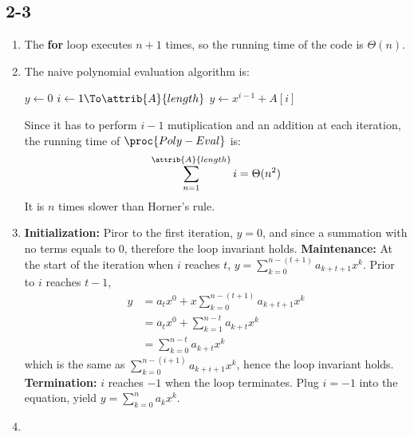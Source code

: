 \subsection{2-3}
\begin{enumerate}[leftmargin=*]
	\item The \textbf{for} loop executes $n+1$ times,
		so the running time of the code is $\Theta(n)$.
	\item The naive polynomial evaluation algorithm is:\\
		\vspace{-1.5em}
		\begin{codebox}
		\li	$y\gets 0$
		\li	\For $i\gets 1 \To \attrib{A}{length}$
			\Do
		\li		$y\gets x^{i-1}+A[i]$
			\End
		\end{codebox}
		Since it has to perform $i-1$ mutiplication and
		an addition at each iteration, the running time of
		$\proc{Poly-Eval}$ is:
		\begin{displaymath}
			\sum_{n=1}^{\attrib{A}{length}} i=\Theta(n^2)
		\end{displaymath}
		It is $n$ times slower than Horner's rule.
	\item \textbf{Initialization:} Piror to the first
		iteration, $y=0$, and since a summation with
		no terms equals to $0$, therefore the loop
		invariant holds.
		\textbf{Maintenance:} At the start of
		the iteration when $i$ reaches $t$,
		$y=\sum_{k=0}^{n-(t+1)}a_{k+t+1}x^k$.
		Prior to $i$ reaches $t-1$,
		\begin{align*}
			y&= a_tx^0+x\sum_{k=0}^{n-(t+1)}a_{k+t+1}x^k\\
			 &= a_tx^0+\sum_{k=1}^{n-t}a_{k+t}x^k\\
			 &= \sum_{k=0}^{n-t}a_{k+t}x^k
		\end{align*}
		which is the same as
		$\sum_{k=0}^{n-(i+1)}a_{k+i+1}x^k$,
		hence the loop invariant holds.\\
		\textbf{Termination:} $i$ reaches $-1$ when the loop terminates.
		Plug $i=-1$ into the equation, yield
		$y=\sum_{k=0}^{n}a_kx^k$.
	\item
\end{enumerate}
